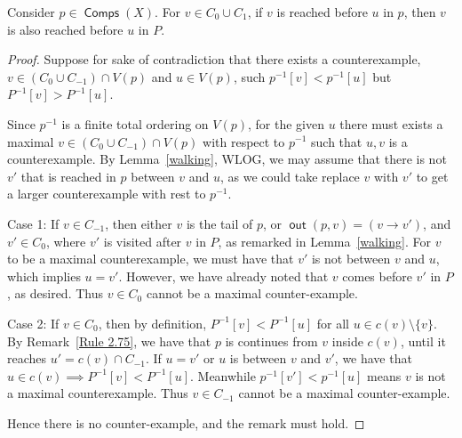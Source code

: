 \documentclass{article}
\DeclareMathOperator{\out}{\bm{\mathsf{out}}}
\DeclareMathOperator{\Comp}{\bm{\mathsf{Comps}}}
\newcommand{\hide}[1]{}
\newcommand{\dc}[1]{}%
\begin{document}
\begin{rmk} \label{ordering rule}Consider $p \in \Comp(X)$. For $v \in C_0\cup C_1$, if $v$ is reached before $u$ in $p$, then $v$ is also reached before $u$ in $P$.

\begin{proof}
Suppose for sake of contradiction that there exists a counterexample, $v \in (C_0 \cup C_{-1})\cap V(p)$ and $u \in V(p)$, such $p^{-1}[v]<p^{-1}[u]$ but $P^{-1}[v]>P^{-1}[u]$. 

Since $p^{-1}$ is a finite total ordering on $V(p)$, for the given $u$ there must exists a maximal $v \in (C_0 \cup C_{-1})\cap V(p)$ with respect to $p^{-1}$ such that $u,v$ is a counterexample. By Lemma~\ref{walking}, WLOG, we may assume that there is not $v'$ that is reached in $p$ between $v$ and $u$, as we could take replace $v$ with $v'$ to get a larger counterexample with rest to $p^{-1}$. 

 Case 1: If $v \in C_{-1}$, then either $v$ is the tail of $p$, or $\out(p,v) = (v \to v')$, and $v' \in C_0$, where $v'$ is visited after $v$ in $P$, as remarked in Lemma~\ref{walking}. For $v$ to be a maximal counterexample, we must have that $v'$ is not between $v$ and $u$, which implies $u = v'$. However, we have already noted that $v$ comes before $v'$ in $P$, as desired. Thus $v \in C_0$ cannot be a maximal counter-example.
 
 
Case 2: If $v \in C_0$, then by definition, $P^{-1}[v] < P^{-1}[u]$ for all $u \in c(v) \setminus \{v\}$. By Remark~\ref{Rule 2.75}, we have that $p$ is continues from $v$ inside $c(v)$, until it reaches $u' = c(v) \cap C_{-1}$.  If $u = v'$ or $u$ is between $v$ and $v'$, we have that $u \in c(v) \implies P^{-1}[v] <P^{-1}[u] $.  Meanwhile $p^{-1}[v']< p^{-1}[u]$ means $v$ is not a maximal counterexample. Thus $v \in C_{-1}$ cannot be a maximal counter-example.

Hence there is no counter-example, and the remark must hold.

\end{proof}

\hide{(this is a consequence of $v$ being the first reached in $c(v)$, first establishing this for the 1-cycle, and then by transitivity, as if we continue to visit another 1-cycle, we reach it with an edge $e \in E(P)$ from $u \in c(v) \cap C_{-1}$ to $v' \in C_0$, and $v$ comes before $u$ which comes before $v'$)} 

\end{rmk}


\dc{it is now clear to me from the proof technique of 5.1, but it absolutely does not follow from the lemma statement alone. I think it would be appropriate to make this a lemma or corollary since it is saying a lot, and give it a proper proof (which can heavily reference the definitions and techniques used in the proof of 5.1)}
\end{document}
